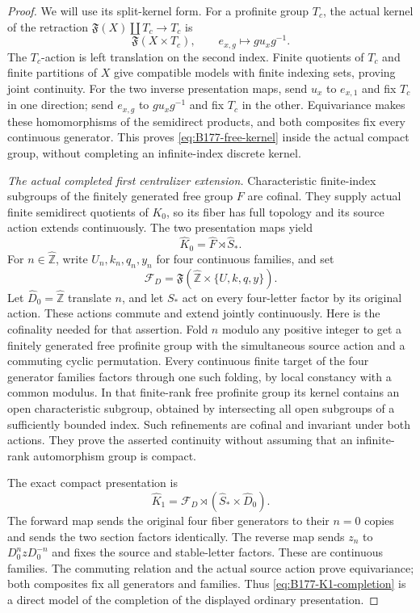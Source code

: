 \begin{proof}
We will use its split-kernel form. For a profinite group \(T_c\),
the actual kernel of the retraction
\(\mathfrak F(X)\amalg T_c\to T_c\) is
\begin{equation}\label{eq:B177-free-kernel}
 \mathfrak F(X\times T_c),\qquad
 e_{x,g}\longmapsto g u_xg^{-1}.
\end{equation}
The \(T_c\)-action is left translation on the second index.
Finite quotients of \(T_c\) and finite partitions of \(X\) give
compatible models with finite indexing sets, proving joint
continuity. For the two inverse presentation maps, send \(u_x\)
to \(e_{x,1}\) and fix \(T_c\) in one direction; send
\(e_{x,g}\) to \(gu_xg^{-1}\) and fix \(T_c\) in the other.
Equivariance makes these homomorphisms of the semidirect products,
and both composites fix every continuous generator. This proves
\eqref{eq:B177-free-kernel} inside the actual compact group,
without completing an infinite-index discrete kernel.

\emph{The actual completed first centralizer extension.}
Characteristic finite-index subgroups of the finitely generated
free group \(F\) are cofinal. They supply actual finite semidirect
quotients of \(K_0\), so its fiber has full topology and its source
action extends continuously. The two presentation maps yield
\[
                       \widehat K_0=\widehat F\rtimes\widehat S_*.
\]
For \(n\in\widehat{\mathbb Z}\), write
\(U_n,k_n,q_n,y_n\) for four continuous families, and set
\[
 \mathcal F_D=
 \mathfrak F(\widehat{\mathbb Z}\times\{U,k,q,y\}).
\]
Let \(\widehat D_0=\widehat{\mathbb Z}\) translate \(n\), and
let \(S_*\) act on every four-letter factor by its original action.
These actions commute and extend jointly continuously. Here is the
cofinality needed for that assertion. Fold \(n\) modulo any positive
integer to get a finitely generated free profinite group with the
simultaneous source action and a commuting cyclic permutation.
Every continuous finite target of the four generator families factors
through one such folding, by local constancy with a common modulus.
In that finite-rank free profinite group its kernel contains an open
characteristic subgroup, obtained by intersecting all open subgroups
of a sufficiently bounded index. Such refinements are cofinal and
invariant under both actions. They prove the asserted continuity
without assuming that an infinite-rank automorphism group is compact.

The exact compact presentation is
\begin{equation}\label{eq:B177-K1-completion}
 \widehat K_1=
       \mathcal F_D\rtimes(\widehat S_*\times\widehat D_0).
\end{equation}
The forward map sends the original four fiber generators to their
\(n=0\) copies and sends the two section factors identically.
The reverse map sends \(z_n\) to \(D_0^n z D_0^{-n}\) and fixes
the source and stable-letter factors. These are continuous families.
The commuting relation and the actual source action prove
equivariance; both composites fix all generators and families.
Thus \eqref{eq:B177-K1-completion} is a direct model of the
completion of the displayed ordinary presentation.


\end{proof}
